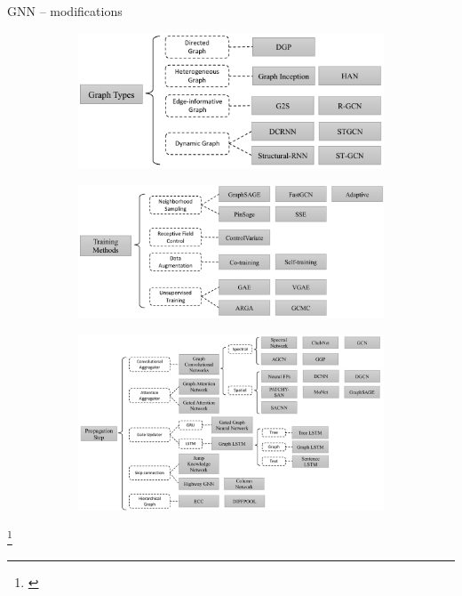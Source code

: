 \documentclass[10pt]{beamer}
\begin{document}
\begin{frame}{GNN -- modifications}
	\begin{figure}[h]
		\centering
		\begin{subfigure}[t]{0.33\textwidth}
			\centering
			\includegraphics[width=1\linewidth]{images/GNN-variants/variant1.pdf}
		\end{subfigure}
		\begin{subfigure}[t]{0.43\textwidth}
			\centering
			\includegraphics[width=1\linewidth]{images/GNN-variants/variant3.pdf}
		\end{subfigure}
		\begin{subfigure}[t]{0.65\textwidth}
			\centering
			\includegraphics[width=1\linewidth]{images/GNN-variants/variant2.pdf}
		\end{subfigure}
	\end{figure}\footnote{\cite{zhou_graph_2019}}
\end{frame}
\end{document}
